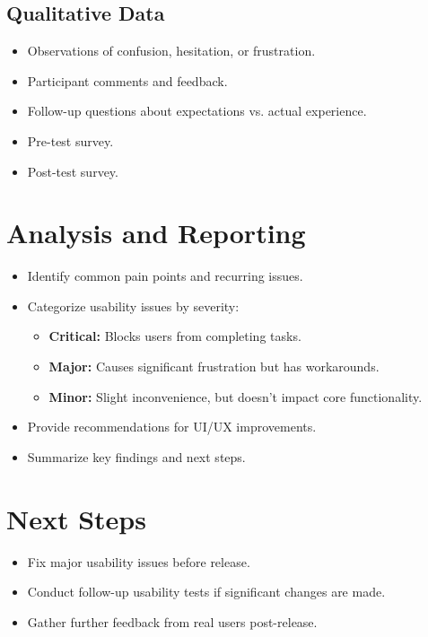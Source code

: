 \documentclass[12pt, titlepage]{article}
\begin{document}
\subsection*{Qualitative Data}
\begin{itemize}
  \item Observations of confusion, hesitation, or frustration.
  \item Participant comments and feedback.
  \item Follow-up questions about expectations vs. actual experience.
  \item Pre-test survey.
  \item Post-test survey.
\end{itemize}

\section*{Analysis and Reporting}
\begin{itemize}
  \item Identify common pain points and recurring issues.
  \item Categorize usability issues by severity:
    \begin{itemize}
      \item \textbf{Critical:} Blocks users from completing tasks.
      \item \textbf{Major:} Causes significant frustration but has workarounds.
      \item \textbf{Minor:} Slight inconvenience, but doesn't impact
        core functionality.
    \end{itemize}
  \item Provide recommendations for UI/UX improvements.
  \item Summarize key findings and next steps.
\end{itemize}

\section*{Next Steps}
\begin{itemize}
  \item Fix major usability issues before release.
  \item Conduct follow-up usability tests if significant changes are made.
  \item Gather further feedback from real users post-release.
\end{itemize}
\end{document}
